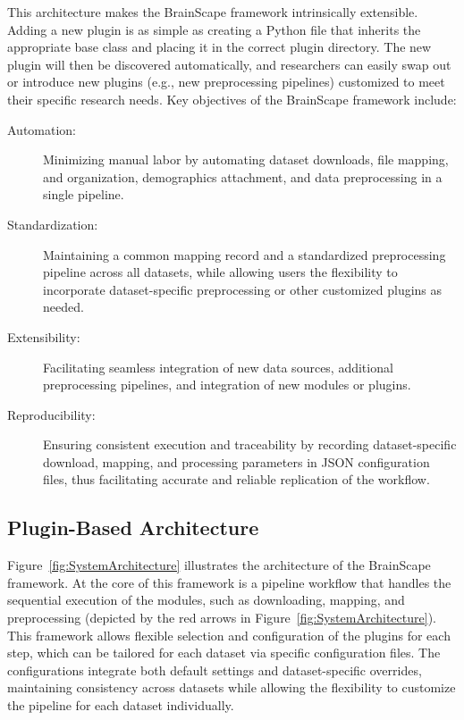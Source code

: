 This architecture makes the BrainScape framework intrinsically extensible. Adding a new plugin
is as simple as creating a Python file that inherits the appropriate base class 
and placing it in the correct plugin directory. 
The new plugin will then be discovered automatically, and 
researchers can easily swap out or introduce new plugins (e.g., new preprocessing pipelines) 
customized to meet their specific research needs.
Key objectives of the BrainScape framework include: 
\begin{description}
    \item[Automation:] Minimizing manual labor by automating dataset downloads, file mapping, and organization, demographics attachment, and data preprocessing in a single pipeline.
    \item[Standardization:] Maintaining a common mapping record and a standardized preprocessing pipeline across all datasets, while allowing users the flexibility to incorporate dataset-specific preprocessing or other customized plugins as needed.
    \item[Extensibility:] Facilitating seamless integration of new data sources, additional preprocessing pipelines, and integration of new modules or plugins. 
    \item[Reproducibility:] Ensuring consistent execution and traceability by recording dataset-specific download, mapping, and processing parameters in JSON configuration files, thus facilitating accurate and reliable replication of the workflow.
\end{description}


\subsection{Plugin-Based Architecture}

Figure~\ref{fig:SystemArchitecture} illustrates the architecture of the BrainScape framework. 
At the core of this framework is a pipeline workflow that handles the sequential execution of the modules, 
such as downloading, mapping, and preprocessing (depicted by the red arrows in Figure~\ref{fig:SystemArchitecture}). 
This framework allows flexible selection and configuration of the plugins for each step, which can be tailored for 
each dataset via specific configuration files.
The configurations integrate both default settings and dataset-specific overrides, maintaining consistency 
across datasets while allowing the flexibility to customize the pipeline for each dataset individually.

